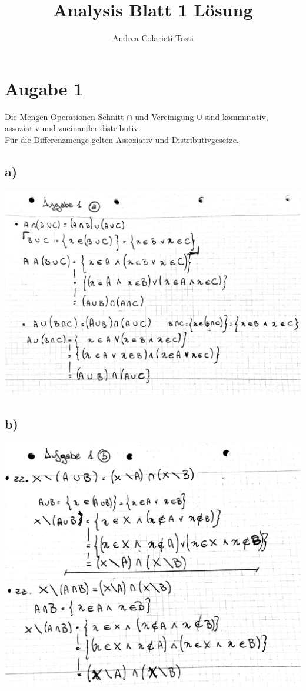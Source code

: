 \documentclass[14pt,a4paper,landscape]{article}
\author{Andrea Colarieti Tosti}
\title{Analysis Blatt 1 Lösung}
\begin{document}
\maketitle
\newpage

\section*{Augabe 1}
Die Mengen-Operationen Schnitt $\cap$  und Vereinigung $\cup$  sind kommutativ, assoziativ und zueinander distributiv.\\
Für die Differenzmenge gelten Assoziativ und Distributivgesetze.

\subsection*{a)}
\begin{center}
\includegraphics[scale=0.23]{AB1-1_1.jpg} 
\end{center}
\subsection*{b)}
\begin{center}
\includegraphics[scale=0.25]{AB1-1_2.jpg} 
\end{center}
\end{document}
